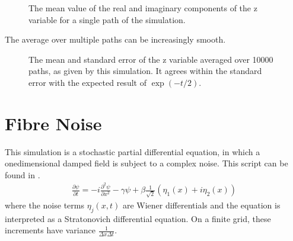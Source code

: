 \documentclass[letterpaper,10pt,english]{sphinxmanual}
\begin{document}
\begin{figure}[htbp]
\centering
\capstart

\noindent{}
\caption{The mean value of the real and imaginary components of the z variable for a single path of the simulation.}\label{\detokenize{worked_examples:id1}}\end{figure}

\sphinxAtStartPar
The average over multiple paths can be increasingly smooth.

\begin{figure}[htbp]
\centering
\capstart

\noindent{}
\caption{The mean and standard error of the z variable averaged over 10000 paths, as given by this simulation.  It agrees within the standard error with the expected result of \(\exp(-t/2)\).}\label{\detokenize{worked_examples:id2}}\end{figure}

\ignorespaces 

\section{Fibre Noise}
\label{\detokenize{worked_examples:fibre-noise}}\label{\detokenize{worked_examples:fibre}}\label{\detokenize{worked_examples:index-5}}
\sphinxAtStartPar
This simulation is a stochastic partial differential equation, in which a one\sphinxhyphen{}dimensional damped field is subject to a complex noise. This script can be found in .
\begin{equation*}
\begin{split}\frac{\partial \psi}{\partial t} = -i \frac{\partial^2 \psi}{\partial x^2} -\gamma \psi+\beta \frac{1}{\sqrt{2}}\left(\eta_1(x)+i\eta_2(x)\right)\end{split}
\end{equation*}
\sphinxAtStartPar
where the noise terms \(\eta_j(x,t)\) are Wiener differentials and the equation is interpreted as a Stratonovich differential equation.  On a finite grid, these increments have variance \(\frac{1}{\Delta x \Delta t}\).
\end{document}
